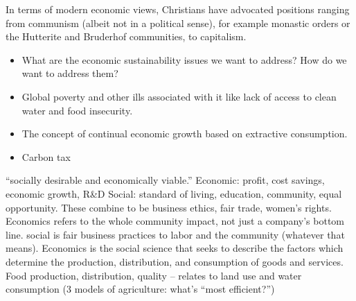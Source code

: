 \documentclass[12pt]{article}
\begin{document}
In terms of modern economic views, Christians have advocated positions ranging from
communism (albeit not in a political sense), for example monastic orders or the Hutterite
and Bruderhof communities, to capitalism.

\begin{itemize}
\item{What are the economic sustainability issues we want to address? How do we want to address them?}
\item{Global poverty and other ills associated with it like lack of access to clean water and food insecurity.}
\item{The concept of continual economic growth based on extractive consumption.}
\item{Carbon tax}
\end{itemize}
%
%
%


``socially desirable and economically viable.''
Economic: profit, cost savings, economic growth, R\&D
Social: standard of living, education, community, equal opportunity. These combine to be business ethics, fair trade, women's rights.
Economics refers to the whole community impact, not just a company's bottom line.
social is fair business practices to labor and the community (whatever that means).
Economics is the social science that seeks to describe the factors which determine the production, distribution, and consumption of goods and services.
Food production, distribution, quality -- relates to land use and water consumption (3 models of agriculture: what's ``most efficient?'')
\end{document}
